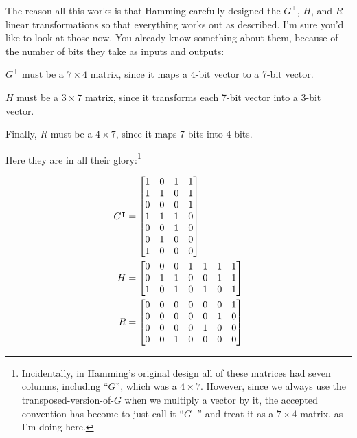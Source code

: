 The reason all this works is that Hamming carefully designed the $G^\intercal$,
$H$, and $R$ linear transformations so that everything works out as described.
I'm sure you'd like to look at those now. You already know something about
them, because of the number of bits they take as inputs and outputs:

\begin{compactitem}
\item $G^\intercal$ must be a $7\times 4$ matrix, since it maps a 4-bit vector to a
7-bit vector.
\item $H$ must be a $3\times 7$ matrix, since it transforms each 7-bit vector
into a 3-bit vector.
\item Finally, $R$ must be a $4\times 7$, since it maps 7 bits into 4 bits.
\end{compactitem}

Here they are in all their glory:\footnote{Incidentally, in Hamming's original
 design all of these matrices had seven columns, including
``$G$'', which was a $4\times 7$. However, since we always use the
transposed-version-of-$G$ when we multiply a vector by it, the accepted
convention has become to just call it ``$G^\intercal$'' and treat it as a
$7\times 4$ matrix, as I'm doing here.}

\vspace{-.15in}
\begin{align*}
G^\intercal &=
\begin{bmatrix}
1 & 0 & 1 & 1\\
1 & 1 & 0 & 1\\
0 & 0 & 0 & 1\\
1 & 1 & 1 & 0\\
0 & 0 & 1 & 0\\
0 & 1 & 0 & 0\\
1 & 0 & 0 & 0\\
\end{bmatrix} \\
\medskip
H &=
\begin{bmatrix}
0 & 0 & 0 & 1 & 1 & 1 & 1 \\
0 & 1 & 1 & 0 & 0 & 1 & 1 \\
1 & 0 & 1 & 0 & 1 & 0 & 1 \\
\end{bmatrix} \\
\medskip
R &=
\begin{bmatrix}
0 & 0 & 0 & 0 & 0 & 0 & 1 \\
0 & 0 & 0 & 0 & 0 & 1 & 0 \\
0 & 0 & 0 & 0 & 1 & 0 & 0 \\
0 & 0 & 1 & 0 & 0 & 0 & 0 \\
\end{bmatrix}
\end{align*}
\vspace{-.15in}

